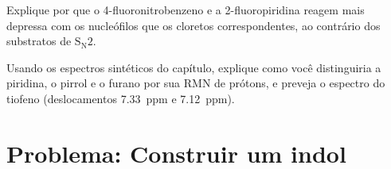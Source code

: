 \begin{exercise}[$\star\star\star$]\label{exo:b3:heterocycles:11}
Explique por que o 4-fluoronitrobenzeno e a 2-fluoropiridina reagem mais depressa com
os nucleófilos que os cloretos correspondentes, ao contrário dos substratos de $\mathrm S_\mathrm N2$.
\end{exercise}

\begin{exercise}[$\star\star\star$]\label{exo:b3:heterocycles:12}
Usando os espectros sintéticos do capítulo, explique como você distinguiria a piridina,
o pirrol e o furano por sua RMN de prótons, e preveja o espectro do
tiofeno (deslocamentos \qty{7.33}{ppm} e \qty{7.12}{ppm}).
\end{exercise}

\section{Problema: Construir um indol}

